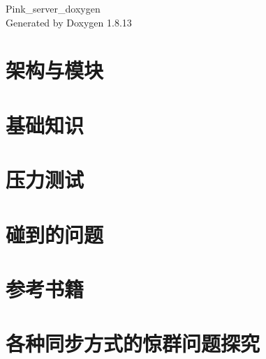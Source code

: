 \documentclass[twoside]{book}
\newcommand{\+}{\discretionary{\mbox{\scriptsize$\hookleftarrow$}}{}{}}
\newcommand{\clearemptydoublepage}{%
  \newpage{\pagestyle{empty}\cleardoublepage}%
}
\begin{document}
\hypersetup{pageanchor=false,
             bookmarksnumbered=true,
             pdfencoding=unicode
            }
\begin{titlepage}
\vspace*{7cm}
\begin{center}%
{\Large Pink\+\_\+server\+\_\+doxygen }\\
\vspace*{1cm}
{\large Generated by Doxygen 1.8.13}\\
\end{center}
\end{titlepage}
\clearemptydoublepage
{}
\tableofcontents
\clearemptydoublepage
{}
\hypersetup{pageanchor=true}

\chapter{架构与模块}
\label{md_knowledge_architecture}

\chapter{基础知识}
\label{md_knowledge_basic}

\chapter{压力测试}
\label{md_knowledge_evaluation}

\chapter{碰到的问题}
\label{md_knowledge_problems}

\chapter{参考书籍}
\label{md_knowledge__r_e_a_d_m_e}

\chapter{各种同步方式的惊群问题探究}
\label{md_knowledge__xE6_x83_x8A_xE7_xBE_xA4_xE9_x97_xAE_xE9_xA2_x98}

\end{document}
